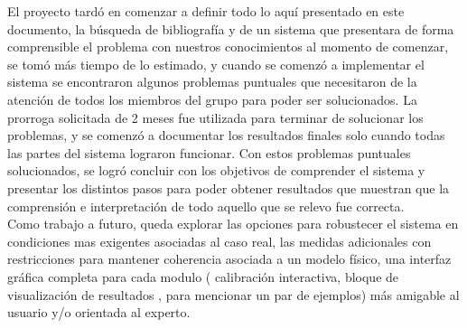 El proyecto tardó en comenzar a definir todo lo aquí presentado en este documento, la búsqueda de bibliografía y de un sistema que presentara de forma comprensible el problema con nuestros conocimientos al momento de comenzar, se tomó más tiempo de lo estimado, y cuando se comenzó a implementar el sistema se encontraron algunos problemas puntuales que necesitaron de la atención de todos los miembros del grupo para poder ser solucionados. La prorroga solicitada de 2 meses fue utilizada para terminar de solucionar los problemas, y se comenzó a documentar los resultados finales solo cuando todas las partes del sistema lograron funcionar. Con estos problemas puntuales solucionados, se logró concluir con los objetivos de comprender el sistema y presentar los distintos pasos para poder obtener resultados que muestran que la comprensión e interpretación de todo aquello que se relevo fue correcta.
\\ 

Como trabajo a futuro, queda explorar las opciones para robustecer el sistema en condiciones mas exigentes asociadas al caso real, las medidas adicionales con restricciones para mantener coherencia asociada a un modelo físico, una interfaz gráfica completa para cada modulo ( calibración interactiva, bloque de visualización de resultados , para mencionar un par de ejemplos) más amigable al usuario y/o orientada al experto.


